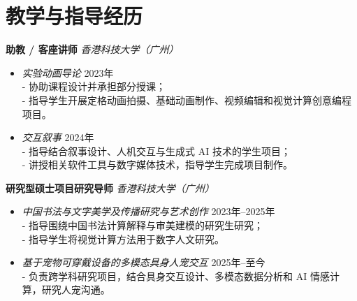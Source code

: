 \section*{教学与指导经历}

\noindent \textbf{助教 / 客座讲师} \hfill \textit{香港科技大学（广州）}
\begin{itemize}[leftmargin=*]
  \item \textit{实验动画导论} \hfill 2023年\\
  - 协助课程设计并承担部分授课；\\
  - 指导学生开展定格动画拍摄、基础动画制作、视频编辑和视觉计算创意编程项目。
  \item \textit{交互叙事} \hfill 2024年\\
  - 指导结合叙事设计、人机交互与生成式 AI 技术的学生项目；\\
  - 讲授相关软件工具与数字媒体技术，指导学生完成项目制作。
\end{itemize}

\noindent \textbf{研究型硕士项目研究导师} \hfill \textit{香港科技大学（广州）}
\begin{itemize}[leftmargin=*]
  \item \textit{中国书法与文字美学及传播研究与艺术创作} \hfill 2023年--2025年\\
  - 指导围绕中国书法计算解释与审美建模的研究生研究；\\
  - 指导学生将视觉计算方法用于数字人文研究。
  \item \textit{基于宠物可穿戴设备的多模态具身人宠交互} \hfill 2025年--至今\\
  - 负责跨学科研究项目，结合具身交互设计、多模态数据分析和 AI 情感计算，研究人宠沟通。
\end{itemize}
